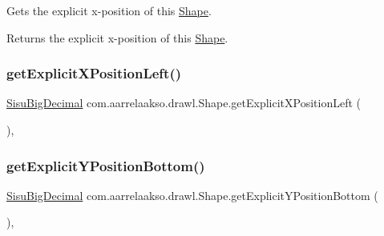 Gets the explicit x-\/position of this \hyperlink{classcom_1_1aarrelaakso_1_1drawl_1_1_shape}{Shape}.

\begin{DoxyReturn}{Returns}
the explicit x-\/position of this \hyperlink{classcom_1_1aarrelaakso_1_1drawl_1_1_shape}{Shape}. 
\end{DoxyReturn}
\mbox{\label{classcom_1_1aarrelaakso_1_1drawl_1_1_shape_a4e26548d18a063bff6bb0781526b909f}} 
\subsubsection{\texorpdfstring{get\+Explicit\+X\+Position\+Left()}{getExplicitXPositionLeft()}}
{\footnotesize\ttfamily \hyperlink{classcom_1_1aarrelaakso_1_1drawl_1_1_sisu_big_decimal}{Sisu\+Big\+Decimal} com.\+aarrelaakso.\+drawl.\+Shape.\+get\+Explicit\+X\+Position\+Left (\begin{DoxyParamCaption}{ }\end{DoxyParamCaption})\hspace{0.3cm}{\ttfamily [protected]}, {\ttfamily [inherited]}}

\mbox{\label{classcom_1_1aarrelaakso_1_1drawl_1_1_shape_adfeaa06d8a6943d8f5bc90e91f0b4fac}} 
\subsubsection{\texorpdfstring{get\+Explicit\+Y\+Position\+Bottom()}{getExplicitYPositionBottom()}}
{\footnotesize\ttfamily \hyperlink{classcom_1_1aarrelaakso_1_1drawl_1_1_sisu_big_decimal}{Sisu\+Big\+Decimal} com.\+aarrelaakso.\+drawl.\+Shape.\+get\+Explicit\+Y\+Position\+Bottom (\begin{DoxyParamCaption}{ }\end{DoxyParamCaption})\hspace{0.3cm}{\ttfamily [protected]}, {\ttfamily [inherited]}}

